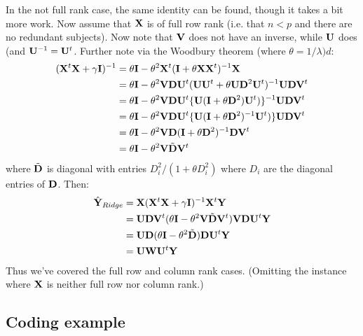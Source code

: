 In the not full rank case, the same identity can be found, though it takes a bit more work. Now assume
that $\mathbf{X}$ is of full row rank (i.e. that $n < p$ and there are no redundant subjects). Now note that
$\mathbf{V}$ does not have an inverse, while $\mathbf{U}$ does (and $\mathbf{U}^{-1} = \mathbf{U}^t$. Further note via
the Woodbury theorem (where $\theta = 1/\lambda)d$:
\begin{align*}
(\mathbf{X}^t \mathbf{X} + \gamma \mathbf{I})^{-1} & = 
\theta \mathbf{I} - \theta^2 \mathbf{X}^t (\mathbf{I} + \theta \mathbf{X} \mathbf{X}^t)^{-1} \mathbf{X} \\
& = \theta \mathbf{I} - \theta^2 \mathbf{V} \mathbf{D} \mathbf{U}^t  (\mathbf{U} \mathbf{U}^t + \theta \mathbf{U} \mathbf{D}^2 \mathbf{U}^t)^{-1} \mathbf{U} \mathbf{D} \mathbf{V}^t \\
& = \theta \mathbf{I} - \theta^2 \mathbf{V} \mathbf{D} \mathbf{U}^t \{\mathbf{U}(\mathbf{I} + \theta \mathbf{D}^2) \mathbf{U}^t)\}^{-1} \mathbf{U} \mathbf{D} \mathbf{V}^t \\
& = \theta \mathbf{I} - \theta^2 \mathbf{V} \mathbf{D} \mathbf{U}^t \{\mathbf{U}(\mathbf{I} + \theta \mathbf{D}^2)^{-1} \mathbf{U}^t)\} \mathbf{U} \mathbf{D} \mathbf{V}^t \\ 
& = \theta \mathbf{I} - \theta^2 \mathbf{V} \mathbf{D} (\mathbf{I} + \theta \mathbf{D}^2)^{-1} \mathbf{D} \mathbf{V}^t \\
& = \theta \mathbf{I} - \theta^2 \mathbf{V} \tilde {\mathbf{D}} \mathbf{V}^t 
\end{align*}
where $\tilde {\mathbf{D}}$ is diagonal with entries $D_i^2 / (1 + \theta D_i^2)$ where $D_i$ are the 
diagonal entries of $\mathbf{D}$. Then:
\begin{align*}
\hat {\mathbf{Y}}_{Ridge} 
& = \mathbf{X} (\mathbf{X}^t \mathbf{X} + \gamma \mathbf{I})^{-1} \mathbf{X}^t \mathbf{Y}  \\
& = \mathbf{U} \mathbf{D} \mathbf{V}^t (\theta \mathbf{I} - \theta^2 \mathbf{V} \tilde {\mathbf{D}} \mathbf{V}^t) \mathbf{V} \mathbf{D} \mathbf{U}^t \mathbf{Y} \\
& = \mathbf{U} \mathbf{D} (\theta \mathbf{I} - \theta^2 \tilde {\mathbf{D}})\mathbf{D} \mathbf{U}^t \mathbf{Y} \\
& = \mathbf{U} \mathbf{W} \mathbf{U}^t \mathbf{Y}
\end{align*}
Thus we've covered the full row and column rank cases. (Omitting the instance where $\mathbf{X}$ is neither
full row nor column rank.)


\subsection{Coding example}

